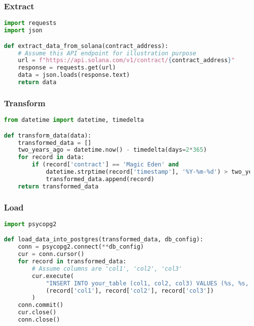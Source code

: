 \subsubsection{Extract}

\begin{lstlisting}[language=Python]
import requests
import json

def extract_data_from_solana(contract_address):
    # Assume this API endpoint for illustration purpose
    url = f"https://api.solana.com/v1/contract/{contract_address}"
    response = requests.get(url)
    data = json.loads(response.text)
    return data
\end{lstlisting}

\subsubsection{Transform}

\begin{lstlisting}[language=Python]
from datetime import datetime, timedelta

def transform_data(data):
    transformed_data = []
    two_years_ago = datetime.now() - timedelta(days=2*365)
    for record in data:
        if (record['contract'] == 'Magic Eden' and 
            datetime.strptime(record['timestamp'], '%Y-%m-%d') > two_years_ago):
            transformed_data.append(record)
    return transformed_data
\end{lstlisting}

\subsubsection{Load}

\begin{lstlisting}[language=Python]
import psycopg2

def load_data_into_postgres(transformed_data, db_config):
    conn = psycopg2.connect(**db_config)
    cur = conn.cursor()
    for record in transformed_data:
        # Assume columns are 'col1', 'col2', 'col3'
        cur.execute(
            "INSERT INTO your_table (col1, col2, col3) VALUES (%s, %s, %s)", 
            (record['col1'], record['col2'], record['col3'])
        )
    conn.commit()
    cur.close()
    conn.close()
\end{lstlisting}
